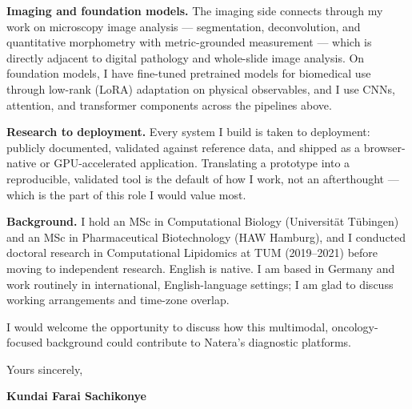 \documentclass[12pt,a4paper]{article}
\begin{document}
\textbf{Imaging and foundation models.}
The imaging side connects through my work on microscopy image analysis ---
segmentation, deconvolution, and quantitative morphometry with metric-grounded
measurement --- which is directly adjacent to digital pathology and whole-slide
image analysis. On foundation models, I have fine-tuned pretrained models for
biomedical use through low-rank (LoRA) adaptation on physical observables, and I
use CNNs, attention, and transformer components across the pipelines above.

\textbf{Research to deployment.}
Every system I build is taken to deployment: publicly documented, validated
against reference data, and shipped as a browser-native or GPU-accelerated
application. Translating a prototype into a reproducible, validated tool is the
default of how I work, not an afterthought --- which is the part of this role I
would value most.

\textbf{Background.}
I hold an MSc in Computational Biology (Universit\"at T\"ubingen) and an MSc in
Pharmaceutical Biotechnology (HAW Hamburg), and I conducted doctoral research in
Computational Lipidomics at TUM (2019--2021) before moving to independent
research. English is native. I am based in Germany and work routinely in
international, English-language settings; I am glad to discuss working
arrangements and time-zone overlap.

I would welcome the opportunity to discuss how this multimodal, oncology-focused
background could contribute to Natera's diagnostic platforms.

\vspace{1.5em}
Yours sincerely,

\vspace{2.5em}
\textbf{Kundai Farai Sachikonye}
\end{document}
